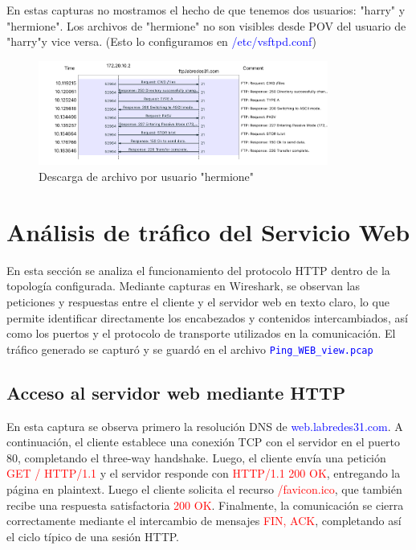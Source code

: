 \documentclass[10pt]{article}
\begin{document}
En estas capturas no mostramos el hecho de que tenemos dos usuarios: "harry" y "hermione". Los archivos de "hermione" no son visibles desde POV del usuario de "harry"y vice versa. (Esto lo configuramos en \textcolor{blue}{/etc/vsftpd.conf})

\begin{figure}[H]
    \centering
    \includegraphics[width=0.85\textwidth]{lab-02-screenshots/8.3-FTP-upload-flow}
    \caption{Descarga de archivo por usuario "hermione"}
\end{figure}
\renewcommand{\thesection}{8.\arabic{section}}
\section{Análisis de tráfico del Servicio Web}
En esta sección se analiza el funcionamiento del protocolo HTTP dentro de la topología configurada. Mediante capturas en Wireshark, se observan las peticiones y respuestas entre el cliente y el servidor web en texto claro, lo que permite identificar directamente los encabezados y contenidos intercambiados, así como los puertos y el protocolo de transporte utilizados en la comunicación. El tráfico generado se capturó y se guardó en el archivo \textcolor{blue}{\texttt{Ping\_WEB\_view.pcap}}
\subsection{Acceso al servidor web mediante HTTP}
En esta captura se observa primero la resolución DNS de \textcolor{blue}{web.labredes31.com}. A continuación, el cliente establece una conexión TCP con el servidor en el puerto 80, completando el three-way handshake. Luego, el cliente envía una petición \textcolor{red}{GET / HTTP/1.1} y el servidor responde con \textcolor{red}{HTTP/1.1 200 OK}, entregando la página en plaintext. Luego el cliente solicita el recurso \textcolor{red}{/favicon.ico}, que también recibe una respuesta satisfactoria \textcolor{red}{200 OK}. Finalmente, la comunicación se cierra correctamente mediante el intercambio de mensajes \textcolor{red}{FIN, ACK}, completando así el ciclo típico de una sesión HTTP.
\end{document}
